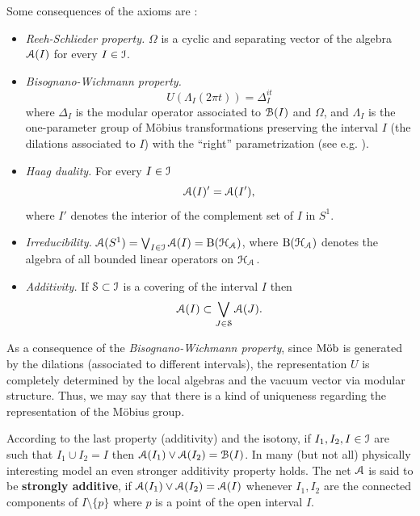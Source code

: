\documentclass[12pt]{article}
\begin{document}
Some consequences of the axioms are \cite{FrG,GuLo96,FJ}:
\begin{itemize}
\item[(i)] {\it Reeh-Schlieder property.}
$\Omega$ is a cyclic and separating vector of the algebra ${\mathcal A}(I)$
for every $I \in {\mathcal I}$.

\item[(ii)] {\it Bisognano-Wichmann property.} 
\begin{equation}
U(\Lambda_I ({2\pi t}))=\Delta_I^{it}
\end{equation}  
where ${\Delta}_{I}$ is the modular operator associated to 
${\mathcal B}(I)$ and $\Omega$, and $\Lambda_I$ is the one-parameter group 
of M\"obius transformations preserving the interval 
$I$ (the dilations associated to $I$) with the ``right'' 
parametrization (see e.g. \cite{GLW}).

\item[(iii)] {\it Haag duality.} For every $I \in {\mathcal I}$
\begin{equation}
{\mathcal A}(I)'= {\mathcal A}(I'),
\end{equation}
where $I'$ denotes the interior of the complement set of 
$I$ in $S^1$.

\item[(iv)] {\it Irreducibility.} ${\mathcal A}(S^1) = \bigvee_{I \in {\mathcal I}} {\mathcal A}(I)
={\rm B}({\mathcal H}_{\mathcal A})$, where ${\rm B}({\mathcal H}_{\mathcal A})$ denotes the algebra of all
bounded linear operators on ${\mathcal H}_{\mathcal A}$.

\item[(v)]{\it Additivity.} 
If ${\mathcal S}\subset {\mathcal I}$ is a covering of the 
interval $I$ then  
\begin{equation}
{\mathcal A}(I)\subset \bigvee_{J\in {\mathcal S}}{\mathcal A}(J).
\end{equation}
\end{itemize}

As a consequence of the {\it Bisognano-Wichmann property}, since $\text {M\"{o}b}$ is
generated by the dilations (associated to different intervals), the
representation $U$ is completely determined by the local algebras and the
vacuum vector via modular structure. Thus, we may say that there is a kind
of uniqueness regarding the representation of the M\"obius group.

According to the last property (additivity) and the isotony, 
if $I_1,I_2,I \in {\mathcal I}$ are such that $I_1 \cup I_2 = I$ then
${\mathcal A}(I_1)\vee{\mathcal A}(I_2)={\mathcal B}(I)$. In many (but not all)
physically interesting model an even stronger 
additivity property holds. The net ${\mathcal A}$ is said to be {\bf strongly
additive}, if ${\mathcal A}(I_1)\vee{\mathcal A}(I_2)={\mathcal A}(I)$ whenever $I_1,I_2$ are the
connected components of $I\setminus \{p\}$ where $p$ is a point of 
the open interval $I$.
\end{document}
